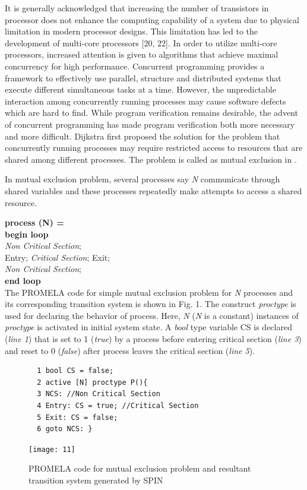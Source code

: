\documentclass[conference]{IEEEtran}
\begin{document}
It is generally acknowledged that increasing the number of transistors in processor does not enhance the computing capability of a system due
to physical limitation in modern processor designs. This limitation has led to the development of multi-core processors [20, 22]. In order to 
utilize multi-core processors, increased attention is given to algorithms that achieve maximal concurrency for high performance. Concurrent
programming provides a framework to effectively use parallel, structure and distributed systems that execute different simultaneous tasks at a 
time. However, the unpredictable interaction among concurrently running processes may cause software defects which are hard to find. While program 
verification remains desirable, the advent of concurrent programming has made program verification both more necessary and more difficult. 
Dijkstra \cite{8} first proposed the solution for the problem that concurrently running processes may require restricted access to resources that are 
shared among different processes. The problem is called as mutual exclusion in \cite{9}. 

In mutual exclusion problem, several processes say \textit{N} communicate through shared variables and these processes repeatedly make attempts 
to access a shared resource.

 \textbf{process (N) =}\\
 \hspace*{.5cm}\textbf{begin loop}\\
 \hspace*{.6cm}\textit{Non Critical Section};\\
 \hspace*{.7cm}Entry; \textit{Critical Section}; Exit;\\
\hspace*{.6cm}\textit{Non Critical Section};\\
\hspace*{.5cm}\textbf{end loop}\\

 The PROMELA code for simple mutual exclusion problem for \textit{N} processes and its corresponding transition system is shown in Fig. 1. 
 The construct \textit{proctype} is used for declaring the behavior of process. Here, \textit{N} (\textit{N}  is a constant) instances of 
 \textit{proctype} is activated in initial system state. 
 A \textit{bool} type variable CS is declared (\textit{line 1}) that is set to 1 (\textit{true}) by a process before entering critical section 
 (\textit{line 3}) and reset to 0 (\textit{false}) after process leaves the critical section (\textit{line 5}).
\begin{figure}[!ht]
{\small 
\begin{verbatim}
  1 bool CS = false;
  2 active [N] proctype P(){
  3 NCS: //Non Critical Section 
  4 Entry: CS = true; //Critical Section
  5 Exit: CS = false;
  6 goto NCS: }      
\end{verbatim}}\vspace{-3mm}
\centering\texttt{[image: 11]}
\caption{PROMELA code for mutual exclusion problem and resultant transition system generated by SPIN} 
\end{figure}
\end{document}
